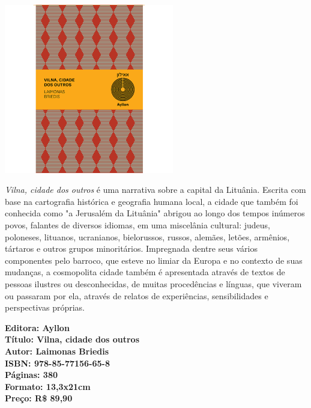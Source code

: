 \pagebreak

\begin{center}
\hspace*{-3.6cm}
\hspace*{3.1cm}\includegraphics[width=74mm]{./grid/vilna.jpg}
\end{center}

\hspace*{-7cm}\hrulefill\hspace*{-7cm}

\medskip

\noindent{}\textit{Vilna, cidade dos outros} é uma narrativa sobre a capital da Lituânia. Escrita com base na cartografia histórica e geografia humana local, a cidade que também foi conhecida como "a Jerusalém da Lituânia" abrigou ao longo dos tempos inúmeros povos, falantes de diversos idiomas, em uma miscelânia cultural: judeus, poloneses, lituanos, ucranianos, bielorussos, russos, alemães, letões, armênios, tártaros e outros grupos minoritários. Impregnada dentre seus vários componentes pelo barroco, que esteve no limiar da Europa e no contexto de suas mudanças, a cosmopolita cidade também é apresentada através de textos de pessoas ilustres ou desconhecidas, de muitas procedências e línguas, que viveram ou passaram por ela, através de relatos de experiências, sensibilidades e perspectivas próprias.

\vfill

\hspace*{-.4cm}\begin{minipage}[c]{1\linewidth}
\small\textbf{
\hspace*{-.1cm}Editora: Ayllon\\
Título: Vilna, cidade dos outros\\
Autor: Laimonas Briedis\\ 
ISBN: 978-85-77156-65-8\\
Páginas: 380\\
Formato: 13,3x21cm\\
Preço: R\$ 89,90
}
\end{minipage}

